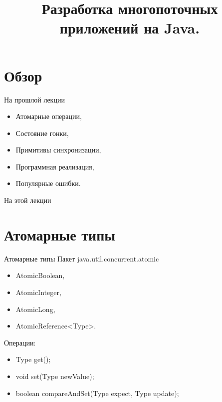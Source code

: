 

\title{Разработка многопоточных приложений на Java.}



\begin{frame}
\titlepage
\end{frame}

\section*{Обзор}

\begin{frame}{На прошлой лекции}
\begin{itemize}
\ifsbertech
    \item Атомарные операции,
    \item Состояние гонки,
    \item Примитивы синхронизации,
    \item Программная реализация,
    \item Популярные ошибки.
\fi
\end{itemize}
\end{frame}

\begin{frame}{На этой лекции}
\tableofcontents
\end{frame}

\section{Атомарные типы}

\begin{frame}{Атомарные типы}
Пакет java.util.concurrent.atomic
\vfill
\begin{itemize}
    \item AtomicBoolean,
    \item AtomicInteger,
    \item AtomicLong,
    \item AtomicReference<Type>.
\end{itemize}
\vfill
Операции:
\begin{itemize}
    \item Type get();
    \item void set(Type newValue);
    \item boolean compareAndSet(Type expect, Type update);
\end{itemize}
\end{frame}

